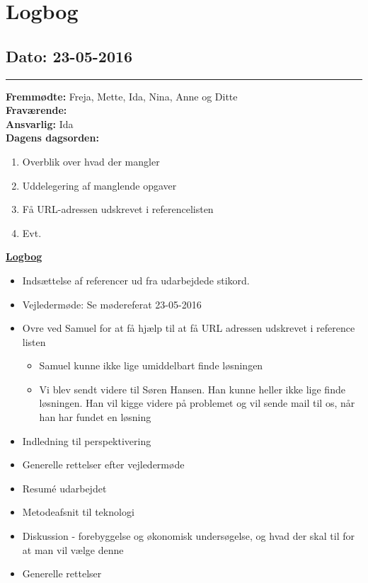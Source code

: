 \chapter{Logbog}
\section{Dato: 23-05-2016}
\hrule
\textbf{Fremmødte:} Freja, Mette, Ida, Nina, Anne og Ditte \\
\textbf{Fraværende: } \\
\textbf{Ansvarlig:} Ida  \\
\textbf{Dagens dagsorden: }
\begin{enumerate}
	\item Overblik over hvad der mangler
	\item Uddelegering af manglende opgaver
	\item Få URL-adressen udskrevet i referencelisten
	\item Evt. 
\end{enumerate}

\underline{\textbf{Logbog}}
\begin{itemize}
\item Indsættelse af referencer ud fra udarbejdede stikord.
\item Vejledermøde: Se mødereferat 23-05-2016
\item Ovre ved Samuel for at få hjælp til at få URL adressen udskrevet i reference listen
\begin{itemize}
\item Samuel kunne ikke lige umiddelbart finde løsningen
\item Vi blev sendt videre til Søren Hansen. Han kunne heller ikke lige finde løsningen. Han vil kigge videre på problemet og vil sende mail til os, når han har fundet en løsning
\end{itemize}
\item Indledning til perspektivering
\item Generelle rettelser efter vejledermøde
\item Resumé udarbejdet
\item Metodeafsnit til teknologi
\item Diskussion - forebyggelse og økonomisk undersøgelse, og hvad der skal til for at man vil vælge denne
\item Generelle rettelser
\end{itemize}

\newpage